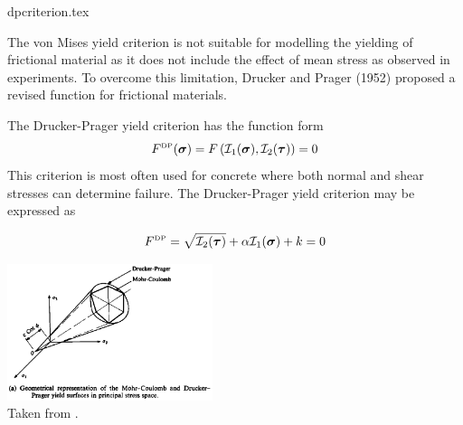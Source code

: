 \begin{flushright} {\tiny {\color{gray} dpcriterion.tex}} \end{flushright}

The von Mises yield criterion is not suitable for modelling the yielding of frictional material 
as it does not include the effect of mean stress as observed in experiments. To overcome this 
limitation, Drucker and Prager (1952) \cite{drpr52} proposed a revised function for frictional materials.

The Drucker-Prager yield criterion has the function form
\begin{equation}
F^{\text{\tiny DP}}({\bm \sigma})=F \left( {\cal I}_1({\bm \sigma}), {\cal I}_2({\bm \tau}) \right) = 0 
\end{equation}
This criterion is most often used for concrete where both normal and shear stresses 
can determine failure. The Drucker-Prager yield criterion may be expressed as
\begin{mdframed}[backgroundcolor=blue!5]
\begin{equation}
F^{\text{\tiny DP}}= \sqrt{{\cal I}_2({\bm \tau})} + \alpha {\cal I}_1({\bm \sigma}) + k =0  
\label{dpcriterion} 
\end{equation}
\end{mdframed}

\begin{center}
\includegraphics[width=6cm]{images/rheology/owenhinton5}\\
{\captionfont Taken from \textcite{owhi}.}
\end{center}

